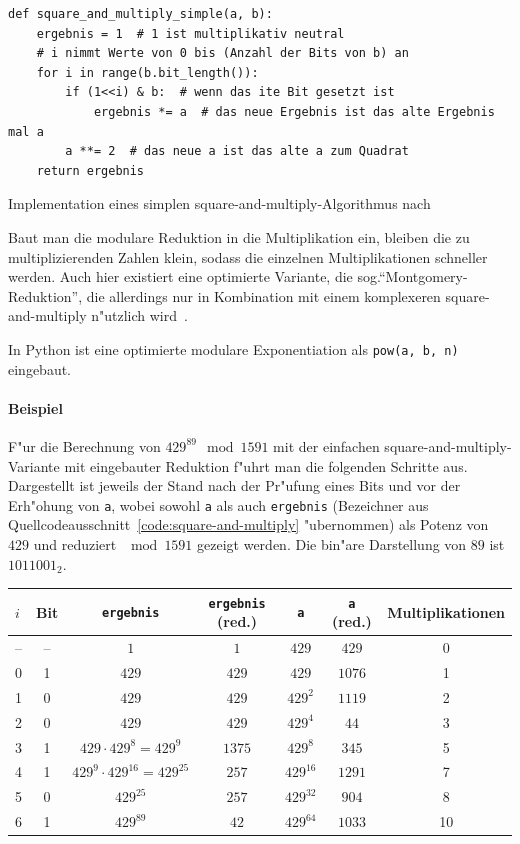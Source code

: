 \documentclass[12pt]{article}
\begin{document}
\begin{code-snip}
\begin{lstlisting}
def square_and_multiply_simple(a, b):
    ergebnis = 1  # 1 ist multiplikativ neutral
    # i nimmt Werte von 0 bis (Anzahl der Bits von b) an
    for i in range(b.bit_length()):
        if (1<<i) & b:  # wenn das ite Bit gesetzt ist
            ergebnis *= a  # das neue Ergebnis ist das alte Ergebnis mal a
        a **= 2  # das neue a ist das alte a zum Quadrat
    return ergebnis
\end{lstlisting}
\caption{Implementation eines simplen square-and-multiply-Algorithmus nach~\cite{hac}}
\label{code:square-and-multiply}
\end{code-snip}

Baut man die modulare Reduktion in die Multiplikation ein,
bleiben die zu multiplizierenden Zahlen klein, sodass die einzelnen
Multiplikationen schneller werden.
Auch hier existiert eine optimierte Variante, die sog.\@ "`Montgomery-Reduktion"',
die allerdings nur in Kombination mit einem komplexeren square-and-multiply n"utzlich wird~\cite{hac}.

In Python ist eine optimierte modulare Exponentiation als \lstinline{pow(a, b, n)} eingebaut.

\paragraph{Beispiel}
F"ur die Berechnung von $429^{89} \mod 1591$ mit der einfachen square-and-multiply-Variante
mit eingebauter Reduktion f"uhrt man die folgenden Schritte aus.
Dargestellt ist jeweils der Stand nach der Pr"ufung eines Bits und vor der Erh"ohung von \texttt{a},
wobei sowohl \texttt{a} als auch \texttt{ergebnis} (Bezeichner aus Quellcodeausschnitt~\ref{code:square-and-multiply} "ubernommen)
als Potenz von $429$ und reduziert $\mod 1591$ gezeigt werden.
Die bin"are Darstellung von $89$ ist $1011001_2$. \\

\begin{tabular}{l|c c c c c c}
    $i$ & Bit & \texttt{ergebnis} & \texttt{ergebnis} (red.\@) & \texttt{a} & \texttt{a} (red.\@) & Multiplikationen\\
    \hline
    \hline
    -- & -- & $1$ & $1$ & $429$ & $429$ & 0 \\
    \hline
    0 & 1 & $429$ & $429$ & $429$ & $1076$ & 1 \\
    1 & 0 & $429$ & $429$ & $429^2$ & $1119$ & 2 \\
    2 & 0 & $429$ & $429$ & $429^4$ & $44$ & 3 \\
    3 & 1 & $429 \cdot 429^8 = 429^9$ & $1375$ & $429^8$ & $345$ & 5 \\
    4 & 1 & $429^9 \cdot 429^{16} = 429^{25}$ & $257$ & $429^{16}$ & $1291$ & 7 \\
    5 & 0 & $429^{25}$ & $257$ & $429^{32}$ & $904$ & 8 \\
    6 & 1 & $429^{89}$ & $42$ & $429^{64}$ & $1033$ & 10 \\
\end{tabular}
\end{document}
